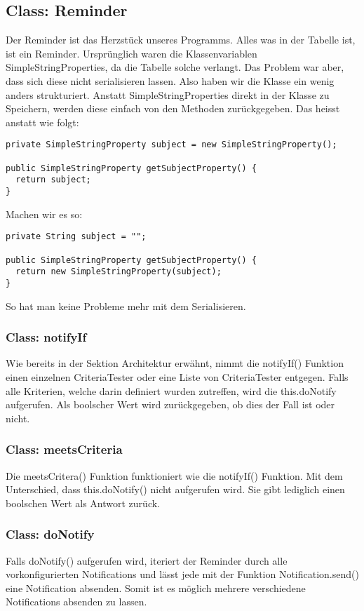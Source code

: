\subsection{Class: Reminder}
Der Reminder ist das Herzstück unseres Programms. Alles was in der Tabelle ist, ist ein Reminder. Ursprünglich waren die Klassenvariablen SimpleStringProperties, da die Tabelle
solche verlangt. Das Problem war aber, dass sich diese nicht serialisieren lassen. Also haben wir die Klasse ein wenig anders strukturiert. Anstatt SimpleStringProperties
direkt in der Klasse zu Speichern, werden diese einfach von den Methoden zurückgegeben.
Das heisst anstatt wie folgt:
\begin{lstlisting}
private SimpleStringProperty subject = new SimpleStringProperty();

public SimpleStringProperty getSubjectProperty() {
  return subject;
}
\end{lstlisting}

Machen wir es so:
\begin{lstlisting}
private String subject = "";

public SimpleStringProperty getSubjectProperty() {
  return new SimpleStringProperty(subject);
}
\end{lstlisting}
So hat man keine Probleme mehr mit dem Serialisieren.

\subsubsection{Class: notifyIf}
Wie bereits in der Sektion  Architektur erwähnt, nimmt die notifyIf() Funktion einen einzelnen CriteriaTester oder eine  Liste von  CriteriaTester entgegen. Falls alle Kriterien,
welche darin definiert wurden zutreffen, wird die this.doNotify aufgerufen. Als boolscher Wert wird zurückgegeben, ob dies der Fall ist oder nicht.
\subsubsection{Class: meetsCriteria}
Die meetsCritera() Funktion funktioniert wie die notifyIf() Funktion. Mit dem Unterschied, dass this.doNotify() nicht aufgerufen wird. Sie gibt lediglich einen boolschen Wert als
Antwort zurück.

\subsubsection{Class: doNotify}
Falls doNotify() aufgerufen wird, iteriert der Reminder durch alle vorkonfigurierten Notifications und lässt jede mit der Funktion Notification.send() eine Notification
absenden. Somit ist es möglich mehrere verschiedene Notifications absenden zu lassen.


